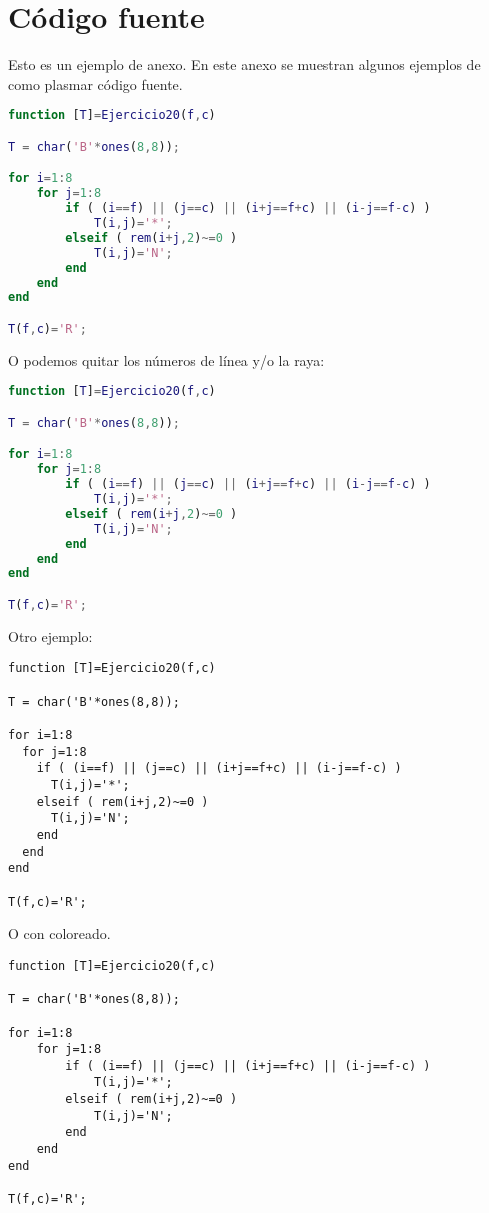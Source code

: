 \section{Código fuente} 
\label{sec:codigo-fuente}

Esto es un ejemplo de anexo. En este anexo se muestran algunos ejemplos de como plasmar código fuente.

\begin{lstlisting}[language=Matlab]
function [T]=Ejercicio20(f,c)

T = char('B'*ones(8,8));

for i=1:8
    for j=1:8
        if ( (i==f) || (j==c) || (i+j==f+c) || (i-j==f-c) )
            T(i,j)='*';
        elseif ( rem(i+j,2)~=0 )
            T(i,j)='N';
        end
    end
end

T(f,c)='R';
\end{lstlisting}

\noindent O podemos quitar los números de línea y/o la raya:

\begin{lstlisting}[language=Matlab,frame=none,numbers=none]
function [T]=Ejercicio20(f,c)

T = char('B'*ones(8,8));

for i=1:8
    for j=1:8
        if ( (i==f) || (j==c) || (i+j==f+c) || (i-j==f-c) )
            T(i,j)='*';
        elseif ( rem(i+j,2)~=0 )
            T(i,j)='N';
        end
    end
end

T(f,c)='R';
\end{lstlisting}

\noindent Otro ejemplo:

\begin{verbatim}
function [T]=Ejercicio20(f,c)

T = char('B'*ones(8,8));

for i=1:8
  for j=1:8
    if ( (i==f) || (j==c) || (i+j==f+c) || (i-j==f-c) )
      T(i,j)='*';
    elseif ( rem(i+j,2)~=0 )
      T(i,j)='N';
    end
  end
end

T(f,c)='R';
\end{verbatim}

\noindent O con coloreado.

\begin{verbatim}
function [T]=Ejercicio20(f,c)

T = char('B'*ones(8,8));

for i=1:8
    for j=1:8
        if ( (i==f) || (j==c) || (i+j==f+c) || (i-j==f-c) )
            T(i,j)='*';
        elseif ( rem(i+j,2)~=0 )
            T(i,j)='N';
        end
    end
end

T(f,c)='R';
\end{verbatim}
